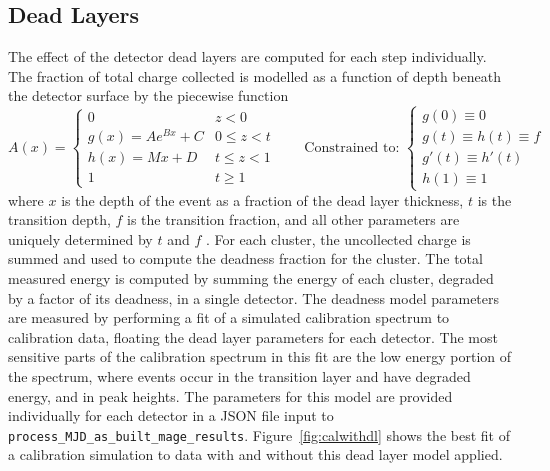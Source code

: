 \documentclass[/main.tex]{subfiles}
\begin{document}
\subsection{Dead Layers}\label{sec:deadlayers}
The effect of the detector dead layers are computed for each step individually.
The fraction of total charge collected is modelled as a function of depth beneath the detector surface by the piecewise function
\begin{equation}
  \label{eq:dlmodel}
  A(x) = \begin{cases}
    0 & z < 0 \\
    g(x)=Ae^{Bx} + C & 0 \leq z < t \\
    h(x)=Mx + D & t \leq z < 1 \\
    1 & t \geq 1
  \end{cases}  \qquad
  \text{Constrained to: } \begin{cases}
    g(0)\equiv 0 \\ g(t)\equiv h(t)\equiv f \\ g'(t)\equiv h'(t) \\ h(1)\equiv 1
  \end{cases}
\end{equation}
where $x$ is the depth of the event as a fraction of the dead layer thickness, $t$ is the transition depth, $f$ is the transition fraction, and all other parameters are uniquely determined by $t$ and $f$ \cite{giovenetti2015phd}\cite{buuck2018}.
For each cluster, the uncollected charge is summed and used to compute the deadness fraction for the cluster.
The total measured energy is computed by summing the energy of each cluster, degraded by a factor of its deadness, in a single detector.
The deadness model parameters are measured by performing a fit of a simulated  calibration spectrum to calibration data, floating the dead layer parameters for each detector.
The most sensitive parts of the calibration spectrum in this fit are the low energy portion of the spectrum, where events occur in the transition layer and have degraded energy, and in peak heights.
The parameters for this model are provided individually for each detector in a JSON file input to \texttt{process\_MJD\_as\_built\_mage\_results}.
Figure~\ref{fig:calwithdl} shows the best fit of a  calibration simulation to data with and without this dead layer model applied.
\end{document}
